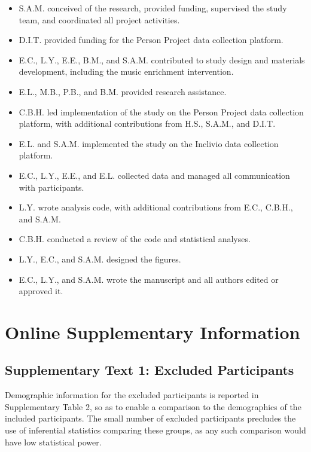 \documentclass[
]{article}
\providecommand{\tightlist}{%
  \setlength{\itemsep}{0pt}\setlength{\parskip}{0pt}}
\begin{document}
\begin{itemize}
\tightlist
\item
  S.A.M. conceived of the research, provided funding, supervised the
  study team, and coordinated all project activities.
\item
  D.I.T. provided funding for the Person Project data collection
  platform.
\item
  E.C., L.Y., E.E., B.M., and S.A.M. contributed to study design and
  materials development, including the music enrichment intervention.
\item
  E.L., M.B., P.B., and B.M. provided research assistance.
\item
  C.B.H. led implementation of the study on the Person Project data
  collection platform, with additional contributions from H.S., S.A.M.,
  and D.I.T.
\item
  E.L. and S.A.M. implemented the study on the Inclivio data collection
  platform.
\item
  E.C., L.Y., E.E., and E.L. collected data and managed all
  communication with participants.
\item
  L.Y. wrote analysis code, with additional contributions from E.C.,
  C.B.H., and S.A.M.
\item
  C.B.H. conducted a review of the code and statistical analyses.
\item
  L.Y., E.C., and S.A.M. designed the figures.
\item
  E.C., L.Y., and S.A.M. wrote the manuscript and all authors edited or
  approved it.
\end{itemize}

\newpage

\section*{Online Supplementary
Information}\label{online-supplementary-information}

\subsection*{Supplementary Text 1: Excluded
Participants}\label{supplementary-text-1-excluded-participants}

Demographic information for the excluded participants is reported in
Supplementary Table 2, so as to enable a comparison to the demographics
of the included participants. The small number of excluded participants
precludes the use of inferential statistics comparing these groups, as
any such comparison would have low statistical power.
\end{document}

